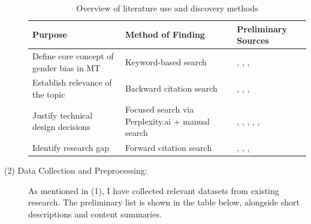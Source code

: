 \documentclass[oneside, paper=A4, DIV=15]{scrartcl}
\begin{document}
\begin{description}
\begin{table}[h!]
\centering
\renewcommand{\arraystretch}{1.3}
\begin{tabularx}{\textwidth}{|X|X|X|}
\hline
\textbf{Purpose} & \textbf{Method of Finding} & \textbf{Preliminary Sources} \\
\hline
Define core concept of gender bias in MT & Keyword-based search & \textcite{prates_assessing_2019}, \textcite{stanovsky_evaluating_2019}, \textcite{cho_measuring_2019}, \textcite{shrestha_exploring_2022} \\
\hline
Establish relevance of the topic & Backward citation search & \textcite{bolukbasi_man_2016}, \textcite{savoldi_what_2024}, \textcite{godsil_effects_2016}, \textcite{braccini_does_2024} \\
\hline
Justify technical design decisions & Focused search via Perplexity.ai + manual search & \textcite{devlin_bert_2019}, \textcite{lardelli_building_2024}, \textcite{tiedemann_opus-mt_2020}, \textcite{stella_dataset_2021}, \textcite{savoldi_mgente_2025}, \textcite{papineni_bleu_2001} \\
\hline
Identify research gap & Forward citation search & \textcite{lardelli_building_2024}, \textcite{gete_does_2024}, \textcite{kappl_are_2025}, \textcite{unior_nlp_research_group_university_of_naples__gender_2023} \\
\hline
\end{tabularx}
\caption{Overview of literature use and discovery methods}
\label{tab:overview_literature}
\end{table}

    
\item[(2) Data Collection and Preprocessing:] 

As mentioned in (1), I have collected relevant datasets from existing research. The preliminary list is shown in the table below, alongside short descriptions and content summaries.


\end{description}
\end{document}
